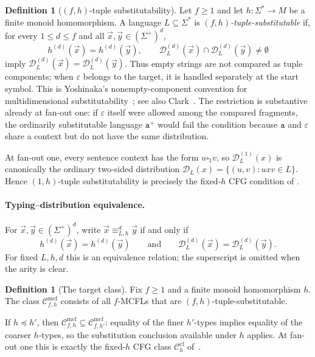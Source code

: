\documentclass[11pt]{article}
\numberwithin{equation}{section}
\theoremstyle{plain}
\theoremstyle{definition}
\newtheorem{definition}[theorem]{Definition}
\theoremstyle{remark}
\newcommand{\Cmcf}[2]{\mathcal{C}^{\mathrm{mcf}}_{#1,#2}}
\newcommand{\D}{\mathcal{D}}
\newcommand{\tuple}[1]{\vec{#1}}
\newcommand{\blank}{\square}
\newcommand{\eps}{\varepsilon}
\begin{document}
\begin{definition}[$(f,h)$-tuple substitutability]
\label{def:tuple-substitutable}
Let $f\ge1$ and let $h:\Sigma^*\to M$ be a finite monoid
homomorphism.  A language $L\subseteq\Sigma^*$ is
\emph{$(f,h)$-tuple-substitutable} if, for every $1\le d\le f$ and all
$\tuple x,\tuple y\in(\Sigma^+)^d$,
\[
 h^{(d)}(\tuple x)=h^{(d)}(\tuple y),\qquad
 \D_L^{(d)}(\tuple x)\cap\D_L^{(d)}(\tuple y)\ne\emptyset
\]
imply $\D_L^{(d)}(\tuple x)=\D_L^{(d)}(\tuple y)$.
Thus empty strings are not compared as tuple components; when $\eps$ belongs
to the target, it is handled separately at the start symbol.  This is Yoshinaka's nonempty-component convention for multidimensional
substitutability~\cite{Yoshinaka2011}; see also Clark~\cite{Clark2013}.  The restriction is
substantive already at fan-out one: if $\eps$ itself were allowed among the
compared fragments, the ordinarily substitutable language $\mathtt a^+$ would fail
the condition because $\mathtt a$ and $\eps$ share a context but do not have the same
distribution.
\end{definition}

At fan-out one, every sentence context has the form
$u\blank_1v$, so $\D_L^{(1)}(x)$ is canonically the ordinary two-sided
distribution $\D_L(x)=\{(u,v):uxv\in L\}$.  Hence $(1,h)$-tuple
substitutability is precisely the fixed-$h$ CFG condition of
\cite{kuriyamaCFG}.

\paragraph{Typing--distribution equivalence.}
For $\tuple x,\tuple y\in(\Sigma^+)^d$, write
$\tuple x\equiv_{L,h}^d\tuple y$ if and only if
\[
 h^{(d)}(\tuple x)=h^{(d)}(\tuple y)
 \qquad\text{and}\qquad
 \D_L^{(d)}(\tuple x)=\D_L^{(d)}(\tuple y).
\]
For fixed $L,h,d$ this is an equivalence relation; the superscript is omitted
when the arity is clear.

\begin{definition}[The target class]
\label{def:class-cmcf}
Fix $f\ge1$ and a finite monoid homomorphism $h$.  The class
$\Cmcf{f}{h}$ consists of all $f$-MCFLs that are
$(f,h)$-tuple-substitutable.
\end{definition}

If $h\preceq h'$, then
$\Cmcf{f}{h}\subseteq\Cmcf{f}{h'}$: equality of the finer $h'$-types implies
equality of the coarser $h$-types, so the substitution conclusion available
under $h$ applies.  At fan-out one this is exactly the fixed-$h$ CFG class
$\mathcal C_h^{\mathrm{cf}}$ of~\cite{kuriyamaCFG}.
\end{document}
